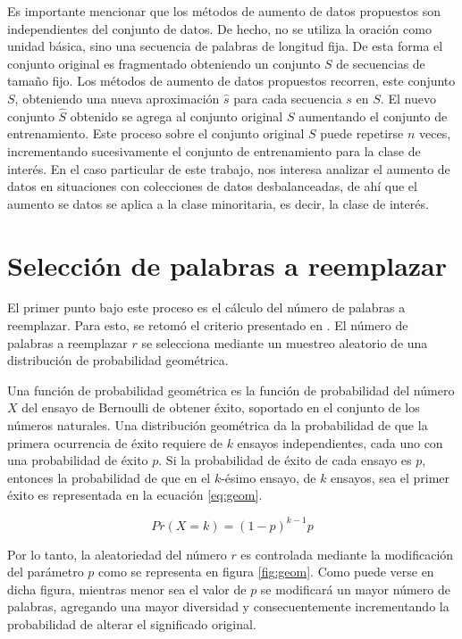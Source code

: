 Es importante mencionar que los métodos de aumento de datos propuestos son independientes del conjunto de datos. De hecho, no se utiliza la oración como unidad básica, sino una secuencia de palabras de longitud fija. De esta forma el conjunto original es fragmentado obteniendo un conjunto $S$ de secuencias de tamaño fijo. Los métodos de aumento de datos propuestos recorren, este conjunto $S$, obteniendo una nueva aproximación $\hat{s}$ para cada secuencia $s$ en $S$. El nuevo conjunto $\hat{S}$ obtenido se agrega al conjunto original $S$ aumentando el conjunto de entrenamiento. Este proceso sobre el conjunto original $S$ puede repetirse $n$ veces, incrementando sucesivamente el conjunto de entrenamiento para la clase de interés.
En el caso particular de este trabajo, nos interesa analizar el aumento de datos en situaciones con colecciones de datos desbalanceadas, de ahí que el aumento se datos se aplica a la clase minoritaria, es decir, la clase de interés. 

\section{Selección de palabras a reemplazar}

El primer punto bajo este proceso es el cálculo del número de palabras a reemplazar. Para esto, se retomó el criterio presentado en \citep{zhang2015character}. El número de palabras a reemplazar $r$ se selecciona mediante un muestreo aleatorio de una distribución de probabilidad geométrica. 

Una función de probabilidad geométrica es la función de probabilidad del número $X$ del ensayo de Bernoulli de obtener éxito, soportado en el conjunto de los números naturales. Una distribución geométrica da la probabilidad de que la primera ocurrencia de éxito requiere de $k$ ensayos independientes, cada uno con una probabilidad de éxito $p$. Si la probabilidad de éxito de cada ensayo es $p$, entonces la probabilidad de que en el $k$-ésimo ensayo, de $k$ ensayos, sea el primer éxito es representada en la ecuación \ref{eq:geom}.

\begin{equation} \label{eq:geom}
    Pr(X=k)=(1-p)^{k-1}p
\end{equation}

Por lo tanto, la aleatoriedad del número $r$ es controlada mediante la modificación del parámetro $p$ como se representa en figura \ref{fig:geom}. Como puede verse en dicha figura, mientras menor sea el valor de $p$ se modificará un mayor número de palabras, agregando una mayor diversidad y consecuentemente incrementando la probabilidad de alterar el significado original. 



